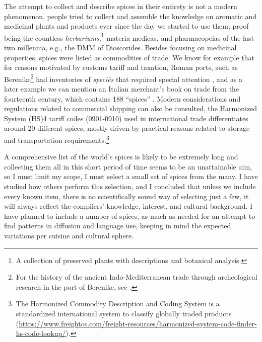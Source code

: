 The attempt to collect and describe spices in their entirety is not a modern phenomenon, people tried to collect and assemble the knowledge on aromatic and medicinal plants and products ever since the day we started to use them; proof being the countless \textit{herbariums},\footnote{A collection of preserved plants with descriptions and botanical analysis.} \glspl{materia medica}, and \glspl{pharmacopeia} of the last two millennia, e.g., the \gls{DMM} of Dioscorides. Besides focusing on medicinal properties, spices were listed as commodities of trade. We know for example that for reasons motivated by customs tariff and taxation, Roman ports, such as Berenike\footnote{For the history of the ancient Indo-Mediterranean trade through archeological research in the port of Berenike, see \textcite{sidebotham_berenike_2011}.} had inventories of \textit{speciēs} that required special attention \autocite{parthasarathi_roman_2015}, and as a later example we can mention an Italian merchant's book on trade from the fourteenth century, which contains 188 ``spices'' \autocite[411-435]{pegolotti_pratica_1936}. Modern considerations and regulations related to commercial shipping can also be consulted, the Harmonized System (HS)4 tariff codes (0901-0910) used in international trade differentiates around 20 different spices, mostly driven by practical reasons related to storage and transportation requirements.\footnote{The Harmonized Commodity Description and Coding System is a standardized international system to classify globally traded products (\url{https://www.freightos.com/freight-resources/harmonized-system-code-finder-hs-code-lookup/}).}


A comprehensive list of the world's spices is likely to be extremely long and collecting them all in this short period of time seems to be an unattainable aim, so I must limit my scope, I must select a small set of spices from the many. I have studied how others perform this selection, and I concluded that unless we include every known item, there is no scientifically sound way of selecting just a few, it will always reflect the compilers' knowledge, interest, and cultural background. I have planned to include a number of spices, as much as needed for an attempt to find patterns in diffusion and language use, keeping in mind the expected variations per cuisine and cultural sphere. 



